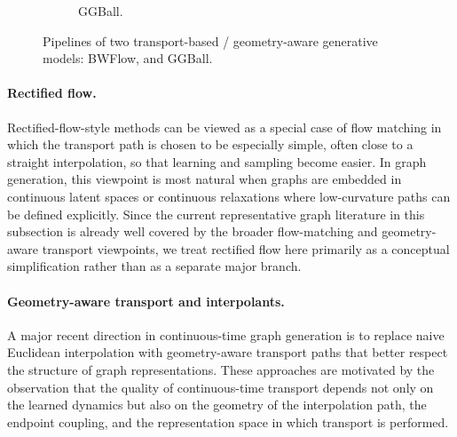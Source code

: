 \documentclass{article}
\begin{document}
\begin{figure}[htbp]
\begin{subfigure}[t]{\textwidth}
\caption{GGBall.}
\end{subfigure}

\caption{Pipelines of two transport-based / geometry-aware generative models: BWFlow, and GGBall.}
\label{fig:alignflow_bwflow_ggball_pipelines}
\end{figure}


\paragraph{Rectified flow.}
Rectified-flow-style methods can be viewed as a special case of flow matching in which the transport path is chosen to be especially simple, often close to a straight interpolation, so that learning and sampling become easier. In graph generation, this viewpoint is most natural when graphs are embedded in continuous latent spaces or continuous relaxations where low-curvature paths can be defined explicitly. Since the current representative graph literature in this subsection is already well covered by the broader flow-matching and geometry-aware transport viewpoints, we treat rectified flow here primarily as a conceptual simplification rather than as a separate major branch.

\paragraph{Geometry-aware transport and interpolants.}
A major recent direction in continuous-time graph generation is to replace naive Euclidean interpolation with geometry-aware transport paths that better respect the structure of graph representations. These approaches are motivated by the observation that the quality of continuous-time transport depends not only on the learned dynamics but also on the geometry of the interpolation path, the endpoint coupling, and the representation space in which transport is performed.
\end{document}
